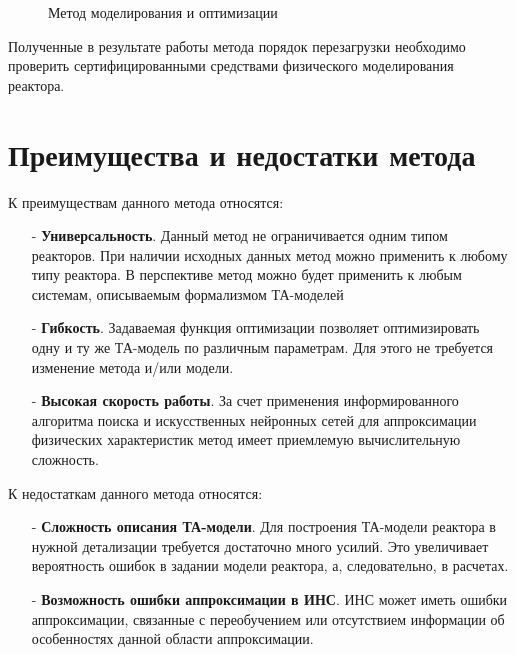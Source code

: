 \begin{figure}[ht]
\caption{Метод моделирования и оптимизации}
\label{pic:method-whitebox}
\end{figure}

Полученные в результате работы метода порядок перезагрузки необходимо проверить сертифицированными средствами физического моделирования реактора.


\section{Преимущества и недостатки метода}

К преимуществам данного метода относятся:
\begin{itemize}
 \item [-] \textbf{Универсальность}.
 Данный метод не ограничивается одним типом реакторов.
 При наличии исходных данных метод можно применить к любому типу реактора.
 В перспективе метод можно будет применить к любым системам, описываемым формализмом ТА-моделей
 
 \item [-] \textbf{Гибкость}. 
 Задаваемая функция оптимизации позволяет оптимизировать одну и ту же ТА-модель по различным параметрам.
 Для этого не требуется изменение метода и/или модели.
 
 \item [-] \textbf{Высокая скорость работы}.
 За счет применения информированного алгоритма поиска и искусственных нейронных сетей для аппроксимации физических характеристик метод имеет приемлемую вычислительную сложность.
\end{itemize}

К недостаткам данного метода относятся:
\begin{itemize}
 \item [-] \textbf{Сложность описания ТА-модели}.
 Для построения ТА-модели реактора в нужной детализации требуется достаточно много усилий.
 Это увеличивает вероятность ошибок в задании модели реактора, а, следовательно, в расчетах.
 
 \item [-] \textbf{Возможность ошибки аппроксимации в ИНС}.
 ИНС может иметь ошибки аппроксимации, связанные с переобучением или отсутствием информации об особенностях  данной области аппроксимации.
\end{itemize}

